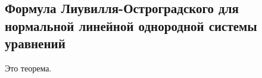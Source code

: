 



\subsection*{Формула Лиувилля-Остроградского для нормальной линейной однородной системы уравнений}

\begin{theorem}
    Это  теорема.
\end{theorem}


